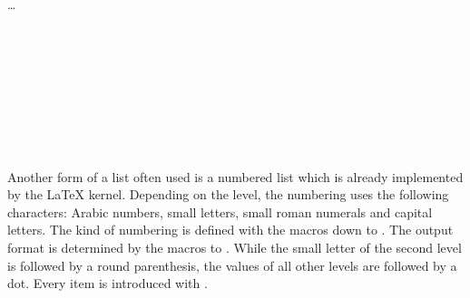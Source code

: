 \begin{Declaration}
  \\
  \quad{}\\
  \quad\dots\\
  \\
  \\
  \\
  \\
  \\
  \\
  \\
  \\
\end{Declaration}%
%
%
%
%
%
%
%
%
%
%
Another form of a list often used is a numbered list which is already
implemented by the {\LaTeX} kernel. Depending on the level, the
numbering uses the following characters: Arabic numbers,
small letters, small roman numerals and capital letters. The kind of numbering
is defined with the macros  down to . The
output format is determined by the macros  to
. While the small letter of the second level is followed by
a round parenthesis, the values of all other levels are followed by a
dot. Every item is introduced with .%
\ifCommonmaincls
